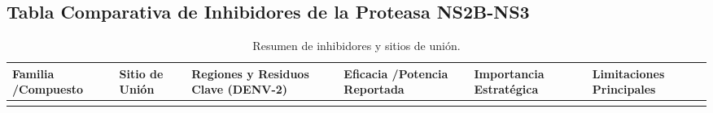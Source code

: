  \subsection{Tabla Comparativa de Inhibidores de la Proteasa NS2B-NS3}
 \begingroup
\scriptsize %
\setlength{\tabcolsep}{1.5pt} %
\begin{xltabular}{\textwidth}{
  >{\hsize\RaggedRight\arraybackslash}X
  >{\hsize\RaggedRight\arraybackslash}X
  >{\hsize\RaggedRight\arraybackslash}X
  >{\hsize\RaggedRight\arraybackslash}X
  >{\hsize\RaggedRight\arraybackslash}X
  >{\hsize\RaggedRight\arraybackslash}X
}
\caption{Resumen de inhibidores y sitios de unión.} \label{tab:inhibidores} \\ %
\toprule
\textbf{Familia /\allowbreak Compuesto} & \textbf{Sitio de Unión} & \textbf{Regiones y Residuos Clave (DENV-2)} & \textbf{Eficacia /\allowbreak Potencia Reportada} & \textbf{Importancia Estratégica} & \textbf{Limitaciones Principales} \\
\midrule
\endhead

\bottomrule
\endfoot


\end{xltabular}

